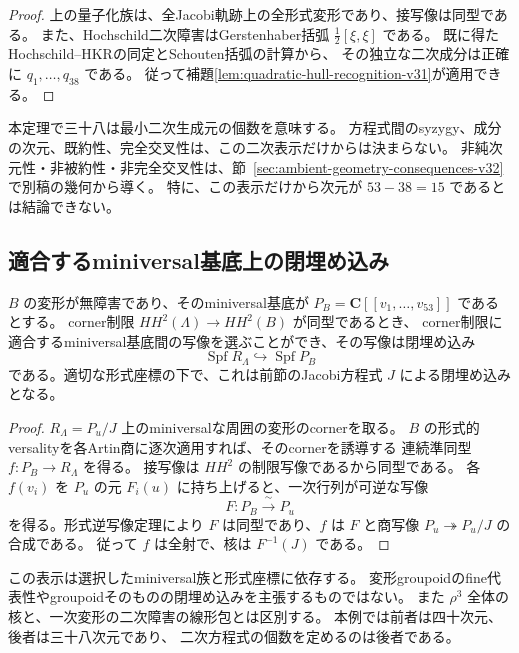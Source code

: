 \begin{proof}
上の量子化族は、全Jacobi軌跡上の全形式変形であり、接写像は同型である。
また、Hochschild二次障害はGerstenhaber括弧 $\frac12[\xi,\xi]$ である。
既に得たHochschild--HKRの同定とSchouten括弧の計算から、
その独立な二次成分は正確に $q_1,\ldots,q_{38}$ である。
従って補題\ref{lem:quadratic-hull-recognition-v31}が適用できる。
\end{proof}

本定理で三十八は最小二次生成元の個数を意味する。
方程式間のsyzygy、成分の次元、既約性、完全交叉性は、この二次表示だけからは決まらない。
非純次元性・非被約性・非完全交叉性は、節~\ref{sec:ambient-geometry-consequences-v32}で別稿の幾何から導く。
特に、この表示だけから次元が $53-38=15$ であるとは結論できない。

\subsection{適合するminiversal基底上の閉埋め込み}

\begin{proposition}[corner写像の基底上の表示]
\label{prop:compatible-hull-closed-embedding-v31}
$B$ の変形が無障害であり、そのminiversal基底が
$P_B=\mathbf C[[v_1,\ldots,v_{53}]]$ であるとする。
corner制限 $HH^2(\Lambda)\to HH^2(B)$ が同型であるとき、
corner制限に適合するminiversal基底間の写像を選ぶことができ、その写像は閉埋め込み
\[
 \operatorname{Spf}R_\Lambda\hookrightarrow\operatorname{Spf}P_B
\]
である。適切な形式座標の下で、これは前節のJacobi方程式 $J$ による閉埋め込みとなる。
\end{proposition}

\begin{proof}
$R_\Lambda=P_u/J$ 上のminiversalな周囲の変形のcornerを取る。
$B$ の形式的versalityを各Artin商に逐次適用すれば、そのcornerを誘導する
連続準同型 $f:P_B\to R_\Lambda$ を得る。
接写像は $HH^2$ の制限写像であるから同型である。
各 $f(v_i)$ を $P_u$ の元 $F_i(u)$ に持ち上げると、一次行列が可逆な写像
\[
 F:P_B\xrightarrow{\ \sim\ }P_u
\]
を得る。形式逆写像定理により $F$ は同型であり、$f$ は $F$ と商写像
$P_u\twoheadrightarrow P_u/J$ の合成である。
従って $f$ は全射で、核は $F^{-1}(J)$ である。
\end{proof}

この表示は選択したminiversal族と形式座標に依存する。
変形groupoidのfine代表性やgroupoidそのものの閉埋め込みを主張するものではない。
また $\rho^3$ 全体の核と、一次変形の二次障害の線形包とは区別する。
本例では前者は四十次元、後者は三十八次元であり、
二次方程式の個数を定めるのは後者である。

